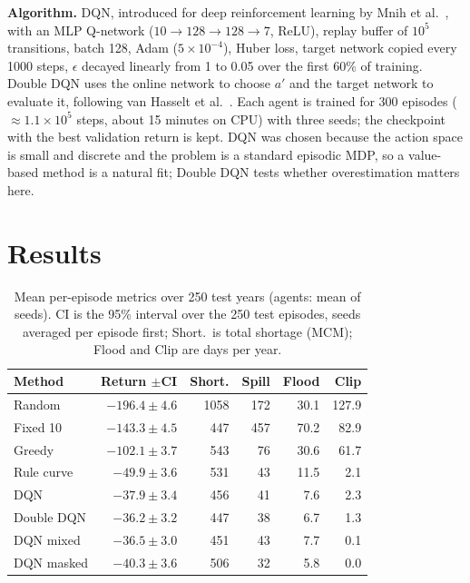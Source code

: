 \documentclass[10pt,twocolumn]{article}
\begin{document}
\textbf{Algorithm.} DQN, introduced for deep reinforcement learning by Mnih et al.~\cite{mnih2015}, with an MLP Q-network ($10\to128\to128\to7$, ReLU), replay buffer of $10^5$ transitions, batch 128, Adam ($5\times10^{-4}$), Huber loss, target network copied every 1000 steps, $\epsilon$ decayed linearly from 1 to 0.05 over the first 60\% of training. Double DQN uses the online network to choose $a'$ and the target network to evaluate it, following van Hasselt et al.~\cite{vanhasselt2016}. Each agent is trained for 300 episodes ($\approx1.1\times10^5$ steps, about 15 minutes on CPU) with three seeds; the checkpoint with the best validation return is kept. DQN was chosen because the action space is small and discrete and the problem is a standard episodic MDP, so a value-based method is a natural fit; Double DQN tests whether overestimation matters here.

\section{Results}
\begin{table}[h]
\centering\footnotesize
\setlength{\tabcolsep}{3.5pt}
\caption{Mean per-episode metrics over 250 test years (agents: mean of seeds). CI is the 95\% interval over the 250 test episodes, seeds averaged per episode first; Short.\ is total shortage (MCM); Flood and Clip are days per year.}
\label{tab:main}
\begin{tabular}{lrrrrr}
\toprule
Method & Return $\pm$CI & Short. & Spill & Flood & Clip\\
\midrule
Random        & $-196.4\pm4.6$ & 1058 & 172 & 30.1 & 127.9\\
Fixed 10      & $-143.3\pm4.5$ &  447 & 457 & 70.2 &  82.9\\
Greedy        & $-102.1\pm3.7$ &  543 &  76 & 30.6 &  61.7\\
Rule curve    &  $-49.9\pm3.6$ &  531 &  43 & 11.5 &   2.1\\
DQN           &  $-37.9\pm3.4$ &  456 &  41 &  7.6 &   2.3\\
Double DQN    &  $-36.2\pm3.2$ &  447 &  38 &  6.7 &   1.3\\
DQN mixed     &  $-36.5\pm3.0$    & 451 & 43 & 7.7 & 0.1\\
DQN masked    &  $-40.3\pm3.6$     & 506 & 32 & 5.8 & 0.0\\
\bottomrule
\end{tabular}
\end{table}
\end{document}
